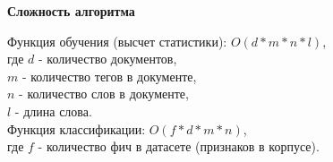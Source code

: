 \textbf{Сложность алгоритма}

Функция обучения (высчет статистики): $ O(d*m*n*l) $, \\
где $d$ - количество документов, \\
$m$ - количество тегов в документе, \\
$n$ - количество слов в документе, \\
$l$ - длина слова. \\

Функция классификации: $ O(f*d*m*n) $, \\
где $f$ - количество фич в датасете (признаков в корпусе).

\pagebreak